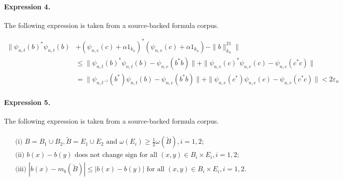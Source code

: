 \documentclass[11pt]{article}
\begin{document}
\paragraph{Expression 4.} The following expression is taken from a source-backed formula corpus.

\begin{align*}\|\psi_{n,t}(b)^*\psi_{n,t}(b)&+(\psi_{n,e}(c)+\alpha1_{k_n})^*(\psi_{n,e}(c)+\alpha1_{k_n})-\|b\|^21_{k_n}\|\\&\leq \|\psi_{n,t}(b)^*\psi_{n,t}(b)-\psi_{n,e}(b^*b)\|+\|\psi_{n,e}(c)^*\psi_{n,e}(c)-\psi_{n,e}(c^*c)\|\\&= \|\psi_{n,t^{-1}}(b^*)\psi_{n,t}(b)-\psi_{n,e}(b^*b)\|+\|\psi_{n,e}(c^*)\psi_{n,e}(c)-\psi_{n,e}(c^*c)\|<2\varepsilon_n\end{align*}

\paragraph{Expression 5.} The following expression is taken from a source-backed formula corpus.

\begin{align*}\begin{aligned}& \text{(i) } B=B_1\cup B_2, \widetilde B= E_1\cup E_2 \text{ and }\omega(E_i)\ge \frac12\omega(\widetilde B), i=1,2;\\& \text{(ii) } b(x)-b(y) \text{ does not change sign for all }(x,y)\in B_i\times E_i, i=1,2; \\&\text{(iii) } |b(x)-m_b(\tilde B)|\le |b(x)-b(y)| \text{ for all }(x,y)\in B_i\times E_i, i=1,2.\end{aligned}\end{align*}
\end{document}
